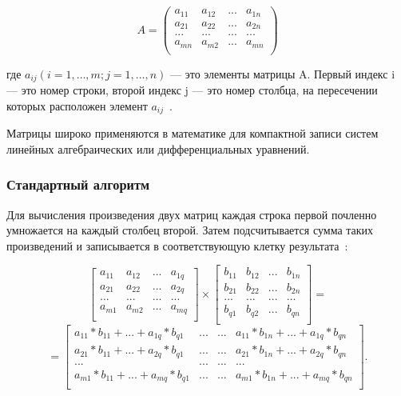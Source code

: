 \documentclass[a4paper,14pt]{article}
\begin{document}
	\[A = \begin{pmatrix}
a_{11} & a_{12} & ... & a_{1n}\\
a_{21} & a_{22} & ... & a_{2n}\\
... & ... & ... & ...\\
a_{mn} & a_{m2} & ... & a_{mn}\\
\end{pmatrix} \]

 где $a_{ij} (i = 1, …, m; j =1, …, n)$ — это элементы матрицы A. Первый индекс i — это номер строки, второй индекс j — это номер столбца, на пересечении которых расположен элемент $a_{ij}$~\cite{matr}.

		    
		
	Матрицы широко применяются в математике для компактной записи систем линейных алгебраических или дифференциальных уравнений.
	
	    \subsubsection{Стандартный алгоритм}
	Для вычисления произведения двух матриц каждая строка первой
почленно умножается на каждый столбец второй. Затем подсчитывается сумма таких произведений и записывается в соответствующую клетку результата~\cite{macconel}:

\[ \begin{bmatrix}
a_{11} & a_{12} & ... & a_{1q}\\
a_{21} & a_{22} & ... & a_{2q}\\
... & ... & ... & ...\\
a_{m1} & a_{m2} & ... & a_{mq}\\
\end{bmatrix} \times 
\begin{bmatrix}
b_{11} & b_{12} & ... & b_{1n}\\
b_{21} & b_{22} & ... & b_{2n}\\
... & ... & ... & ...\\
b_{q1} & b_{q2} & ... & b_{qn}\\
\end{bmatrix} = \]
\[=\begin{bmatrix}
a_{11}*b_{11} + ... + a_{1q}*b_{q1} & ... & ... & a_{11}*b_{1n} + ... + a_{1q}*b_{qn}\\
a_{21}*b_{11} + ... + a_{2q}*b_{q1} & ... & ... & a_{21}*b_{1n} + ... + a_{2q}*b_{qn}\\
... & ... & ... & ...\\
a_{m1}*b_{11} + ... + a_{mq}*b_{q1} & ... & ... & a_{m1}*b_{1n} + ... + a_{mq}*b_{qn}\\
\end{bmatrix}. \]
		     		
\end{document}

